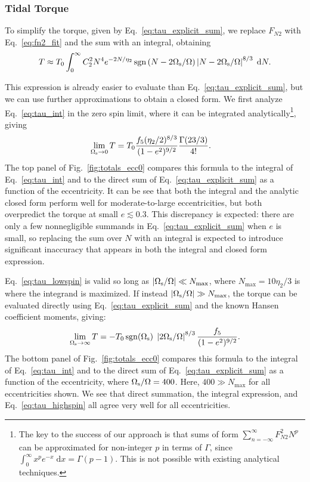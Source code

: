\documentclass[
        fleqn,
        usenatbib,
    ]{mnras}
\newcommand*{\abs}[1]{\left|#1\right|}
\DeclareMathOperator*{\sgn}{sgn}
\begin{document}
\subsubsection{Tidal Torque}\label{ss:torque_eval}

To simplify the torque, given by Eq.~\eqref{eq:tau_explicit_sum}, we replace
$F_{N2}$ with Eq.~\eqref{eq:fn2_fit} and the sum with an integral, obtaining
\begin{equation}
    T \approx T_0 \int_0^\infty C_2^2 N^4 e^{-2N / \eta_2}
        \sgn\left(N - 2\Omega_{\rm s} / \Omega\right) \left|N - 2 \Omega_{\rm s} /
            \Omega\right|^{8/3}\;\mathrm{d}N.\label{eq:tau_int}
\end{equation}

This expression is already easier to evaluate than
Eq.~\eqref{eq:tau_explicit_sum}, but we can use further approximations to obtain
a closed form. We first analyze Eq.~\eqref{eq:tau_int} in the zero spin limit,
where it can be integrated analytically\footnote{The key to the success of our
approach is that sums of form $\sum_{n = -\infty}^\infty F_{N2}^2 N^p$ can be
approximated for non-integer $p$ in terms of $\Gamma$, since $\int_0^\infty
x^pe^{-x}\;\mathrm{d}x = \Gamma(p - 1)$. This is not possible with existing
analytical techniques.}, giving
\begin{align}
    \lim_{\Omega_{\rm s} \to 0} T &= T_0 \frac{f_5 (\eta_2/2)^{8/3}}{(1 -
        e^2)^{9/2}} \frac{\Gamma(23/3)}{4!}.\label{eq:tau_lowspin}
\end{align}
The top panel of Fig.~\ref{fig:totals_ecc0} compares this formula to the
integral of Eq.~\eqref{eq:tau_int} and to the direct sum of
Eq.~\eqref{eq:tau_explicit_sum} as a function of the eccentricity. It can be see
that both the integral and the analytic closed form perform well for
moderate-to-large eccentricities, but both overpredict the torque at small $e
\lesssim 0.3$. This discrepancy is expected: there are only a few nonnegligible
summands in Eq.~\eqref{eq:tau_explicit_sum} when $e$ is small, so replacing the
sum over $N$ with an integral is expected to introduce significant inaccuracy
that appears in both the integral and closed form expression.

Eq.~\eqref{eq:tau_lowspin} is valid so long as $\abs{\Omega_{\rm s} / \Omega} \ll
N_{\max}$, where $N_{\max} = 10 \eta_2/3$ is where the integrand is maximized.
If instead $\abs{\Omega_{\rm s} / \Omega} \gg N_{\max}$, the torque can be
evaluated directly using Eq.~\eqref{eq:tau_explicit_sum} and the known Hansen
coefficient moments, giving:
\begin{equation}
    \lim_{\Omega_{\rm s} \to \infty} T = -T_0 \sgn (\Omega_{\rm s})\;\left|2
        \Omega_{\rm s} / \Omega\right|^{8/3} \frac{f_5}{(1 -
        e^2)^{9/2}}.\label{eq:tau_highspin}
\end{equation}
The bottom panel of Fig.~\ref{fig:totals_ecc0} compares this formula to the
integral of Eq.~\eqref{eq:tau_int} and to the direct sum of
Eq.~\eqref{eq:tau_explicit_sum} as a function of the eccentricity, where
$\Omega_{\rm s} / \Omega = 400$. Here, $400 \gg N_{\max}$ for all eccentricities
shown. We see that direct summation, the integral expression, and
Eq.~\eqref{eq:tau_highspin} all agree very well for all eccentricities.
\end{document}
